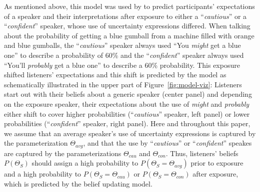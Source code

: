 \documentclass[man,floatsintext]{apa6}
\begin{document}
As mentioned above, this model was used by   to predict participants' expectations of a speaker and their interpretations after exposure to either a ``\textit{cautious}'' or a ``\textit{confident}'' speaker, whose use of uncertainty expressions differed.  When talking about the probability of getting a blue gumball from a machine filled with orange and blue gumballs,  the ``\textit{cautious}'' speaker always used  ``You \textit{might} get a blue one'' to describe a probability of 60\% and the ``\textit{confident}'' speaker always used ``You'll \textit{probably} get a blue one'' to describe a 60\% probability. This exposure shifted listeners' expectations and this shift is predicted by the model as schematically illustrated in the upper part of Figure~\ref{fig:model-viz}: Listeners start out with their beliefs about a generic speaker (center panel) and depending on the exposure speaker, their expectations about the use of \textit{might} and \textit{probably} either shift to cover higher probabilities (``\textit{cautious}'' speaker, left panel) or lower probabilities (``\textit{confident}'' speaker, right panel). Here and throughout this paper, we assume that an average speaker's use of uncertainty expressions is captured by the parameterization $\Theta_{avg}$, and that the use by ``\textit{cautious}'' or ``\textit{confident}'' speakes are captured by the parameterizations $\Theta_{cau}$ and $\Theta_{con}$. Thus, listeners' beliefs $P(\Theta_S)$ should assign a high probability to $P(\Theta_S = \Theta_{avg})$ prior to exposure and a high probability to $P(\Theta_S = \Theta_{cau})$ or $P(\Theta_S = \Theta_{con})$ after exposure, which is predicted by the belief updating model.
\end{document}
